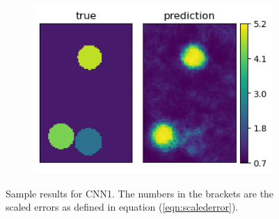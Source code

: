 \documentclass[10pt]{article}
\newcommand{\nhghalfwidth}{0.48\linewidth}
\newcommand{\nhgtotalheight}{4cm}
\begin{document}
\begin{figure}[!h]
\begin{subfigure}[c]{\nhghalfwidth}
  \end{subfigure}
  \begin{subfigure}[c]{\nhghalfwidth}
    \centering
    \includegraphics[totalheight=\nhgtotalheight]{Figures/Results1/ex4/mu.png}
  \end{subfigure}
\caption{\label{fig:cnn1result} Sample results for CNN1. The numbers in the brackets are the scaled errors as defined in equation (\ref{eqn:scalederror}).}  
\end{figure}
%
\end{document}
